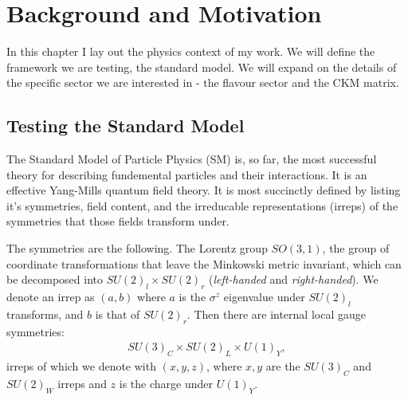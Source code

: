 \chapter{Background and Motivation}
\label{chap:background}

In this chapter I lay out the physics context of my work. We will define the framework we are testing, the standard model. We will expand on the details of the specific sector we are interested in - the flavour sector and the CKM matrix.

\section{Testing the Standard Model}

{}

The Standard Model of Particle Physics (SM) is, so far, the most successful theory for describing fundemental particles and their interactions. It is an effective Yang-Mills quantum field theory. It is most succinctly defined by listing it's symmetries, field content, and the irreducable representations (irreps) of the symmetries that those fields transform under.

The symmetries are the following. The Lorentz group $SO(3,1)$, the group of coordinate transformations that leave the Minkowski metric invariant, which can be decomposed into $SU(2)_l\times SU(2)_r$ ({\it{left-handed}} and {\it{right-handed}}). We denote an irrep as $(a,b)$ where $a$ is the $\sigma^z$ eigenvalue under $SU(2)_l$ transforms, and $b$ is that of $SU(2)_r$. Then there are internal local gauge symmetries:
\begin{align}
  SU(3)_C\times SU(2)_L \times U(1)_Y,
\end{align}
irreps of which we denote with $(x,y,z)$, where $x,y$ are the $SU(3)_C$ and $SU(2)_W$ irreps and $z$ is the charge under $U(1)_Y$.

